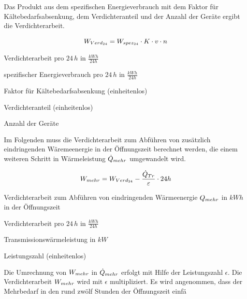 Das Produkt aus dem spezifischen Energieverbrauch mit dem Faktor für
Kältebedarfsabsenkung, dem Verdichteranteil und der Anzahl der Geräte ergibt die
Verdichterarbeit.

\begin{equation}
	\lverd = \lspez \cdot K \cdot v \cdot n
\label{lverd}
\end{equation}

\begin{description}[\dth]

	\item[$\lverd$] Verdichterarbeit pro $24\,h$ in $\frac{kWh}{24h}$
	\item[$\lspez$] spezifischer Energieverbrauch pro $24\,h$ in
		$\frac{kWh}{24h}$
	\item[$K$] Faktor für Kältebedarfsabsenkung (einheitenlos)
	\item[$v$] Verdichteranteil (einheitenlos)
	\item[$n$] Anzahl der Geräte

\end{description}
\vspace{0.5cm}

Im Folgenden muss die Verdichterarbeit zum Abf\"uhren von zus\"atzlich
eindringenden W\"aremeenergie in der \"Offnungszeit berechnet werden, die einem
weiteren Schritt in W\"armeleistung $\dot{Q}_{mehr}$ umgewandelt wird.

\begin{equation}
	\lmehr = \lverd - \frac{\ptrans}{\epsilon} \cdot 24h
\label{lmehr}
\end{equation}

\begin{description}[\dth]

	\item[$\lmehr$] Verdichterarbeit zum Abführen von eindringenden
		Wärmeenergie $Q_{mehr}$ in $kWh$ in der \"Offnungszeit
	\item[$\lverd$] Verdichterarbeit pro $24\,h$ in $\frac{kWh}{24h}$
	\item[$\ptrans$] Transmissionswärmeleistung in $kW$
	\item[$\epsilon$] Leistungszahl (einheitenlos)

\end{description}
\vspace{0.5cm}

Die Umrechnung von $\lmehr$ in $\dot{Q}_{mehr}$ erfolgt mit Hilfe der Leistungszahl
$\epsilon$. Die Verdichterarbeit $\lmehr$ wird mit $\epsilon$ multipliziert.
Es wird angenommen, dass der Mehrbedarf in den rund zw\"olf Stunden der
\"Offnungszeit einf\"a

